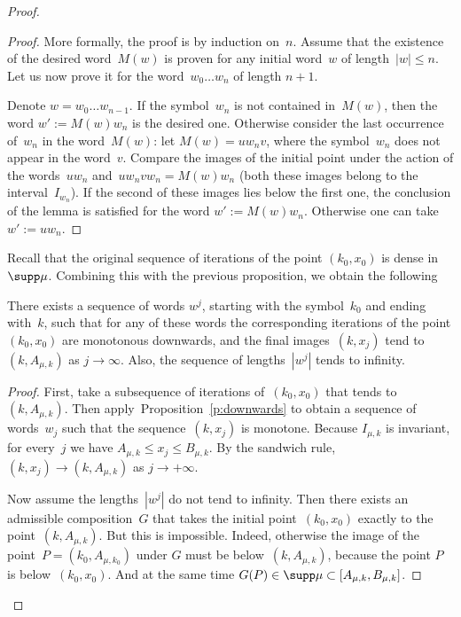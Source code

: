 \documentclass[a4paper,12pt]{amsart}
\begin{document}
\begin{proof}
\begin{proof}
More formally, the proof is by induction on~$n$. Assume that the existence of the desired word~$M(w)$ is proven for any initial word~$w$ of length~$|w| \le n$.
Let us now prove it for the word~$w_0 \ldots w_n$ of length $n+1$.

Denote $w = w_0 \dots w_{n-1}$. If the symbol~$w_n$ is not contained in~$M(w)$, then the word $w':=M(w)w_n$ is the desired one.
Otherwise consider the last occurrence of~$w_n$ in the word~$M(w)$: let
$M(w)=uw_n v$, where the symbol~$w_n$ does not appear in the word~$v$. Compare the images of the initial point under the action of the words~$uw_n$ and~$uw_n vw_n= M(w)w_n$ (both these images belong to the interval~$I_{w_n}$). If the second of these images lies below the first one, the conclusion of the lemma is satisfied for the word $w':=M(w) w_n$. Otherwise one can take~$w' := uw_n$.
\end{proof}

Recall that the original sequence of iterations of the point $(k_0,x_0)$ is dense in~$\supp\mu$. Combining this with the previous proposition, we obtain the following
\begin{Prop}    \label{p:word_constr}
There exists a sequence of words $w^j$, starting with the symbol~$k_0$ and ending with~$k$, such that for any of these words the corresponding iterations of the point $(k_0,x_0)$ are monotonous downwards, and the final images~$(k,x_j)$ tend to~$(k,A_{\mu,k})$ as $j \to \infty$. Also, the sequence of lengths~$|w^j|$ tends to infinity.
\end{Prop}

\begin{proof}
First, take a subsequence of iterations of~$(k_0,x_0)$ that tends to~$(k,A_{\mu,k})$. Then apply~Proposition~\ref{p:downwards} to obtain a sequence of words~$w_j$ such that the sequence~$(k, x_j)$ is monotone. Because $I_{\mu,k}$ is invariant, for every~$j$ we have $A_{\mu,k} \le x_j \le B_{\mu,k}$. By the sandwich rule, $(k,x_j) \to (k,A_{\mu,k})$ as $j \to +\infty$.

Now assume the lengths~$|w^j|$ do not tend to infinity.
Then there exists an admissible composition~$G$ that takes the initial point~$(k_0,x_0)$ exactly to the point~$(k,A_{\mu,k})$. But this is impossible. Indeed, otherwise the image of the point~$P = (k_0,A_{\mu,k_0})$ under $G$ must be below~$(k,A_{\mu,k})$, because the point $P$ is below~$(k_0,x_0)$. And at the same time $G(P) \in \supp \mu \subset [A_{\mu,k}, B_{\mu,k}]$.
\end{proof}



\end{proof}
\end{document}
